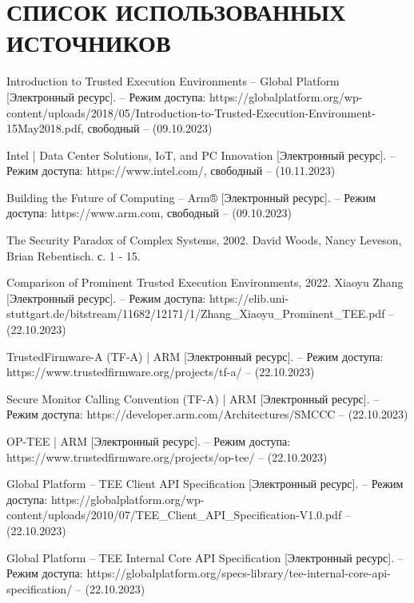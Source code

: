 \section*{СПИСОК ИСПОЛЬЗОВАННЫХ ИСТОЧНИКОВ}

\begingroup
\renewcommand{\section}[2]{}
\begin{thebibliography}{}
Introduction to Trusted Execution Environments -- Global Platform [Электронный ресурс]. – Режим доступа: https://globalplatform.org/wp-content/uploads/2018/05/Introduction-to-Trusted-Execution-Environment-15May2018.pdf, свободный – (09.10.2023)

Intel | Data Center Solutions, IoT, and PC Innovation [Электронный ресурс]. – Режим доступа: https://www.intel.com/, свободный – (10.11.2023)

Building the Future of Computing – Arm® [Электронный ресурс]. – Режим доступа: https://www.arm.com, свободный – (09.10.2023)

The Security Paradox of Complex Systems, 2002. David Woods, Nancy Leveson, Brian Rebentisch. с. 1 - 15.

Comparison of Prominent Trusted Execution Environments, 2022. Xiaoyu Zhang [Электронный ресурс]. – Режим доступа: https://elib.uni-stuttgart.de/bitstream/11682/12171/1/Zhang\_Xiaoyu\_Prominent\_TEE.pdf – (22.10.2023)

TrustedFirmware-A (TF-A) | ARM [Электронный ресурс]. – Режим доступа: https://www.trustedfirmware.org/projects/tf-a/ – (22.10.2023)

Secure Monitor Calling Convention (TF-A) | ARM [Электронный ресурс]. – Режим доступа: https://developer.arm.com/Architectures/SMCCC – (22.10.2023)

OP-TEE | ARM [Электронный ресурс]. – Режим доступа: https://www.trustedfirmware.org/projects/op-tee/ – (22.10.2023)

Global Platform -- TEE Client API Specification [Электронный ресурс]. – Режим доступа: https://globalplatform.org/wp-content/uploads/2010/07/TEE\_Client\_API\_Specification-V1.0.pdf – (22.10.2023)

Global Platform -- TEE Internal Core API Specification [Электронный ресурс]. – Режим доступа: https://globalplatform.org/specs-library/tee-internal-core-api-specification/ – (22.10.2023)


\end{thebibliography}
